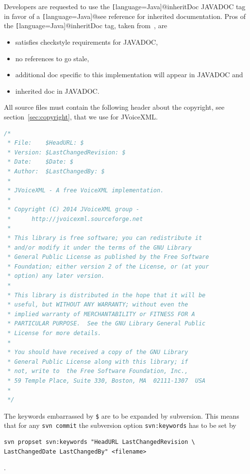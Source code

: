 \documentclass[11pt,a4paper]{article}
\begin{document}
Developers are requested to use the \texttt[language=Java]{@inheritDoc}
JAVADOC tag in favor of a \texttt[language=Java]{@see} reference for inherited documentation.
Pros of the \texttt[language=Java]{@inheritDoc} tag, taken 
from~\cite{tauber:inheritdoc}, are
\begin{itemize}
\item satisfies checkstyle requirements for JAVADOC,
\item no references to go stale,
\item additional doc specific to this implementation will appear in JAVADOC and
\item inherited doc in JAVADOC.
\end{itemize}

All source files must contain the following header about the 
copyright, see section~\ref{sec:copyright}, that we use for JVoiceXML.

\begin{lstlisting}[language=Java]
/*
 * File:    $HeadURL: $
 * Version: $LastChangedRevision: $
 * Date:    $Date: $
 * Author:  $LastChangedBy: $
 *
 * JVoiceXML - A free VoiceXML implementation.
 *
 * Copyright (C) 2014 JVoiceXML group - 
 *      http://jvoicexml.sourceforge.net
 *
 * This library is free software; you can redistribute it 
 * and/or modify it under the terms of the GNU Library 
 * General Public License as published by the Free Software 
 * Foundation; either version 2 of the License, or (at your 
 * option) any later version.
 *
 * This library is distributed in the hope that it will be 
 * useful, but WITHOUT ANY WARRANTY; without even the 
 * implied warranty of MERCHANTABILITY or FITNESS FOR A 
 * PARTICULAR PURPOSE.  See the GNU Library General Public 
 * License for more details.
 *
 * You should have received a copy of the GNU Library 
 * General Public License along with this library; if 
 * not, write to  the Free Software Foundation, Inc., 
 * 59 Temple Place, Suite 330, Boston, MA  02111-1307  USA
 *
 */
\end{lstlisting}

The keywords embarrassed by \texttt{\$} are to be expanded by 
subversion. 
This means that for any \texttt{svn commit} the subversion
option \texttt{svn:keywords} has to be set by

\begin{lstlisting}
svn propset svn:keywords "HeadURL LastChangedRevision \
LastChangedDate LastChangedBy" <filename>
\end{lstlisting}.
\end{document}
